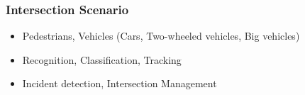 \documentclass[table]{beamer}
\begin{document}
\frame
{
	\frametitle{Intersection Scenario}
	\begin{itemize}
		\item Pedestrians, Vehicles (Cars, Two-wheeled vehicles, Big vehicles)
		\item Recognition, Classification, Tracking
		\item Incident detection, Intersection Management
	\end{itemize}
}
%
\end{document}
